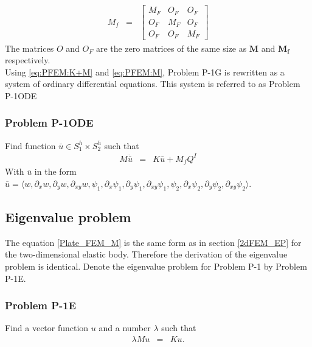 \documentclass[../../main.tex]{subfiles}
\begin{document}
\begin{eqnarray}
	M_f & = &
	\begin{bmatrix}
		{M_F} & {O_F} & {O_F}\\
		{O_F} & {M_F} & {O_F}\\
		{O_F} & {O_F} & {M_F}
	\end{bmatrix}\label{eq:PFEM:M}
\end{eqnarray}
The matrices ${O}$ and ${O_F}$ are the zero matrices of the same size as $\mathbf{M}$ and $\mathbf{M_f}$ respectively.\\


Using \eqref{eq:PFEM:K+M} and \eqref{eq:PFEM:M}, Problem P-1G is rewritten as a system of ordinary differential equations. This system is referred to as Problem P-1ODE
\subsubsection{Problem P-1ODE}
Find function $\bar{u} \in S_1^h\times S_2^h$ such that
\begin{eqnarray}
	M\ddot{\bar{u}} & = & K\bar{u} + M_{f}Q^I \label{Plate_FEM_M}
\end{eqnarray}
With $\bar{u}$ in the form $\bar{u} = \langle w, \partial_x w, \partial_y w, \partial_{xy} w, \psi_1, \partial_x \psi_1, \partial_y \psi_1, \partial_{xy} \psi_1, \psi_2, \partial_x \psi_2, \partial_y \psi_2, \partial_{xy} \psi_2 \rangle$.

\subsection{Eigenvalue problem}

The equation \eqref{Plate_FEM_M} is the same form as in section \ref{2dFEM_EP} for the two-dimensional elastic body. Therefore the derivation of the eigenvalue problem is identical. Denote the eigenvalue problem for Problem P-1 by Problem P-1E.
\subsubsection{Problem P-1E}
Find a vector function $u$ and a number $\lambda$ such that
\begin{eqnarray}
	\lambda M{u} & = & K{u}.
\end{eqnarray}
\end{document}
